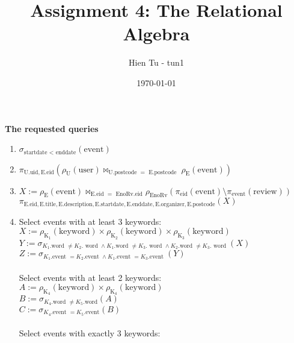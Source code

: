 \documentclass{article}
\title{Assignment 4: The Relational Algebra}
\author{Hien Tu - tun1}
\date{\today}
\newcommand{\GETS}{:=}
\newcommand{\rename}{\rho}
\newcommand{\select}{\sigma}
\newcommand{\rel}[1]{\text{#1}}
\newcommand{\attr}[1]{\text{#1}}
\newcommand{\ra}[2]{\rel{#1}.\attr{#2}}
\newcommand{\project}{\pi}
\newcommand{\product}{\times}
\newcommand{\difference}{\setminus}
\begin{document}
\maketitle

\textbf{The requested queries}
\begin{enumerate}
  \item $\select_{\attr{startdate } < \attr{ enddate}}(\rel{event})$ \\
  \item $\project_{\ra{U}{uid}, \ra{E}{eid}}
          (\rename_{\rel{U}}(\rel{user}) \Join_{\ra{U}{postcode } = \ra{ E}{postcode }}
          \rename_{\rel{E}}(\rel{event}))$ \\
  \item $X \GETS
          \rename_{\rel{E}}(\rel{event}) \Join_{\ra{E}{eid } = \ra{ EnoRv}{eid}}
          \rename_{\rel{EnoRv}}
            (\project_{\attr{eid}}(\rel{event}) \difference
            \project_{\attr{event}}(\rel{review}))$ \\
        $\project_{\ra{E}{eid}, \ra{E}{title}, \ra{E}{description},
          \ra{E}{startdate}, \ra{E}{enddate}, \ra{E}{organizer},
          \ra{E}{postcode}}(X)$ \\
  \item Select events with at least 3 keywords: \\
        $X \GETS \rename_{\rel{K}_1}(\attr{keyword}) \product
                  \rename_{\rel{K}_2}(\attr{keyword}) \product
                  \rename_{\rel{K}_3}(\attr{keyword})$ \\
        $Y \GETS \select_{K_1.\attr{word } \neq K_2.\attr{ word } \land
                          K_1.\attr{word } \neq K_3.\attr{ word } \land
                          K_2.\attr{word } \neq K_3.\attr{ word }}(X)$ \\
        $Z \GETS \select_{K_1.\attr{event } = K_2.\attr{event } \land
                          K_1.\attr{event } = K_3.\attr{event }}(Y)$ \\ \\
        Select events with at least 2 keywords: \\
        $A \GETS \rename_{\rel{K}_4}(\attr{keyword}) \product
                  \rename_{\rel{K}_4}(\attr{keyword})$ \\
        $B \GETS \select_{K_4.\attr{word } \neq K_5.\attr{word}}(A)$ \\
        $C \GETS \select_{K_4.\attr{event } = K_5.\attr{event}}(B)$ \\ \\
        Select events with exactly 3 keywords: \\

\end{enumerate}
\end{document}
